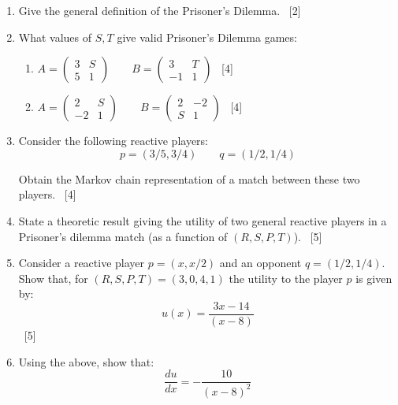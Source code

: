 \documentclass[12pt,a4paper]{article}
\begin{document}
\begin{enumerate}
\begin{enumerate}
        \item Give the general definition of the Prisoner's Dilemma.
            ~\hfill{[2]}
        \item What values of $S, T$ give valid Prisoner's Dilemma games:
            \begin{enumerate}
                \item  \(A =
                         \begin{pmatrix}
                            3 & S\\
                            5 & 1
                         \end{pmatrix}
                         \qquad
                         B =
                         \begin{pmatrix}
                            3 & T\\
                            -1 & 1
                         \end{pmatrix}
                       \)
                ~\hfill{[4]}
                \item  \(A =
                         \begin{pmatrix}
                            2 & S\\
                            -2 & 1
                         \end{pmatrix}
                         \qquad
                         B =
                         \begin{pmatrix}
                            2 & -2\\
                            S & 1
                         \end{pmatrix}
                       \)
                ~\hfill{[4]}
            \end{enumerate}
        \item Consider the following reactive players:
            \[p = (3/5, 3/4)\qquad q = (1/2, 1/4)\]

            Obtain the Markov chain representation of a match between
                    these two players.
                    ~\hfill{[4]}
        \item State a theoretic result giving the utility of two general
            reactive players in a Prisoner's dilemma match (as a function of
            \((R, S, P, T)\)).
            ~\hfill{[5]}
        \item Consider a reactive player \(p=(x, x / 2)\) and an opponent
            \(q=(1/2, 1/4)\). Show that, for \((R, S, P, T)=(3, 0, 4, 1)\) the 
            utility to the player \(p\) is given by:
            \[
                u(x)=\frac{3x - 14}{\left(x - 8\right)}
            \]
            ~\hfill{[5]}
        \item Using the above, show that:
            \[
                \frac{du}{dx}=- \frac{10}{(x - 8) ^ 2}
            \]


\end{enumerate}
\end{enumerate}
\end{document}

